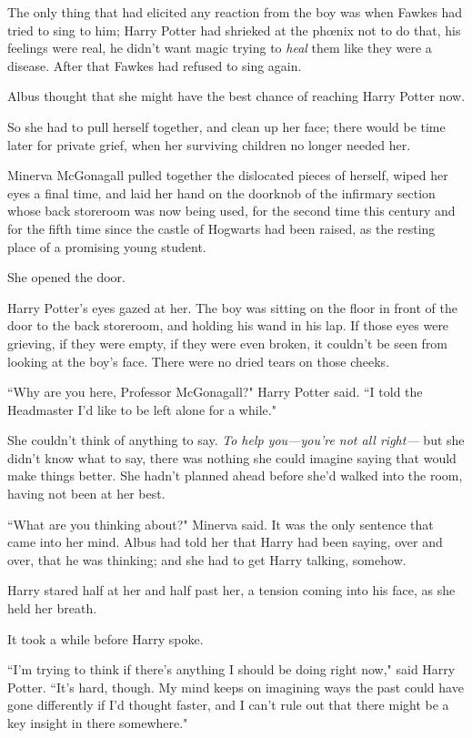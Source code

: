 The only thing that had elicited any reaction from the boy was when Fawkes had tried to sing to him; Harry Potter had shrieked at the phœnix not to do that, his feelings were real, he didn't want magic trying to \emph{heal} them like they were a disease. After that Fawkes had refused to sing again.

Albus thought that she might have the best chance of reaching Harry Potter now.

So she had to pull herself together, and clean up her face; there would be time later for private grief, when her surviving children no longer needed her.

Minerva McGonagall pulled together the dislocated pieces of herself, wiped her eyes a final time, and laid her hand on the doorknob of the infirmary section whose back storeroom was now being used, for the second time this century and for the fifth time since the castle of Hogwarts had been raised, as the resting place of a promising young student.

She opened the door.

Harry Potter's eyes gazed at her. The boy was sitting on the floor in front of the door to the back storeroom, and holding his wand in his lap. If those eyes were grieving, if they were empty, if they were even broken, it couldn't be seen from looking at the boy's face. There were no dried tears on those cheeks.

``Why are you here, Professor McGonagall?" Harry Potter said. ``I told the Headmaster I'd like to be left alone for a while."

She couldn't think of anything to say. \emph{To help you---you're not all right---} but she didn't know what to say, there was nothing she could imagine saying that would make things better. She hadn't planned ahead before she'd walked into the room, having not been at her best.

``What are you thinking about?" Minerva said. It was the only sentence that came into her mind. Albus had told her that Harry had been saying, over and over, that he was thinking; and she had to get Harry talking, somehow.

Harry stared half at her and half past her, a tension coming into his face, as she held her breath.

It took a while before Harry spoke.

``I'm trying to think if there's anything I should be doing right now," said Harry Potter. ``It's hard, though. My mind keeps on imagining ways the past could have gone differently if I'd thought faster, and I can't rule out that there might be a key insight in there somewhere."

